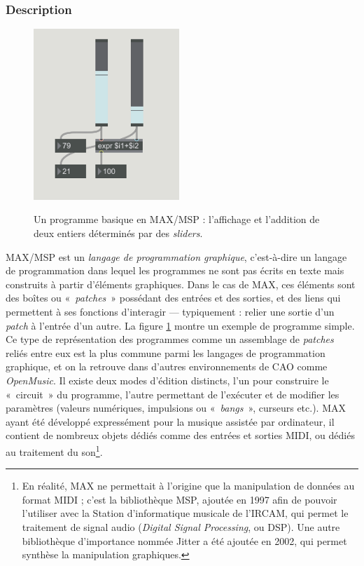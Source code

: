 \documentclass[a4paper,12pt]{article}
\newcommand{\guill}[1]{«~#1~»}
\begin{document}
\subsubsection{Description}

\begin{figure}[h!]
\centering
\includegraphics[width=5.5cm]{images/MAXbase.png}
\label{maxmsp}
\caption{\footnotesize Un programme basique en MAX/MSP : l'affichage et l'addition de deux entiers déterminés par des \emph{sliders}.}
\end{figure}

MAX/MSP est un \emph{langage de programmation graphique}, c'est-à-dire un langage de programmation dans lequel les programmes ne sont pas écrits en texte mais construits à partir d'éléments graphiques. Dans le cas de MAX, ces éléments sont des boîtes ou \guill{\emph{patches}} possédant des entrées et des sorties, et des liens qui permettent à ses fonctions d'interagir --- typiquement : relier une sortie d'un \emph{patch} à l'entrée d'un autre. La figure \ref{maxmsp} montre un exemple de programme simple. Ce type de représentation des programmes comme un assemblage de \emph{patches} reliés entre eux est la plus commune parmi les langages de programmation graphique, et on la retrouve dans d'autres environnements de CAO comme \emph{OpenMusic}. Il existe deux modes d'édition distincts, l'un pour construire le \guill{circuit} du programme, l'autre permettant de l'exécuter et de modifier les paramètres (valeurs numériques, impulsions ou \guill{\emph{bangs}}, curseurs etc.). MAX ayant été développé expressément pour la musique assistée par ordinateur, il contient de nombreux objets dédiés comme des entrées et sorties MIDI, ou dédiés au traitement du son\footnote{En réalité, MAX ne permettait à l'origine que la manipulation de données au format MIDI ; c'est la bibliothèque MSP, ajoutée en 1997 afin de pouvoir l'utiliser avec la Station d'informatique musicale de l'IRCAM, qui permet le traitement de signal audio (\emph{Digital Signal Processing}, ou DSP). Une autre bibliothèque d'importance nommée Jitter a été ajoutée en 2002, qui permet synthèse la manipulation graphiques.}.
\end{document}
